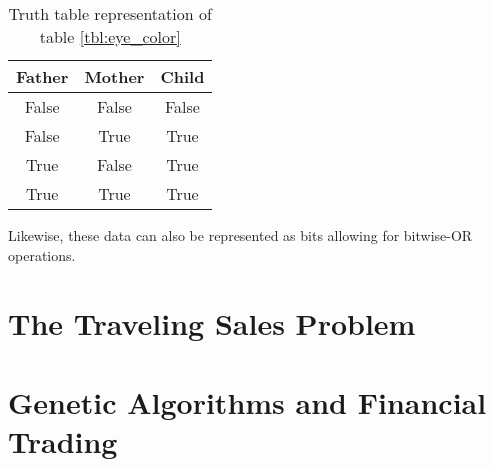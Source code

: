 \documentclass{article}
\renewcommand{\_}{\ifincsname_\else\legacyunderscore\fi}
\begin{document}
    \begin{table}[h]
        \centering
        \begin{tabular}{|c|c|c|}
            \hline
            Father & Mother & Child \\
            \hline
            False  & False  & False \\
            \hline
            False  & True   & True \\
            \hline            
            True   & False  & True \\
            \hline
            True   & True   & True \\
            \hline
        \end{tabular}
        \caption{Truth table representation of table \ref{tbl:eye_color}}
        \label{tbl:eye_color_truth}
    \end{table}

    Likewise, these data can also be represented as bits allowing for bitwise-OR operations.
\section*{The Traveling Sales Problem}

\section*{Genetic Algorithms and Financial Trading}
\end{document}
